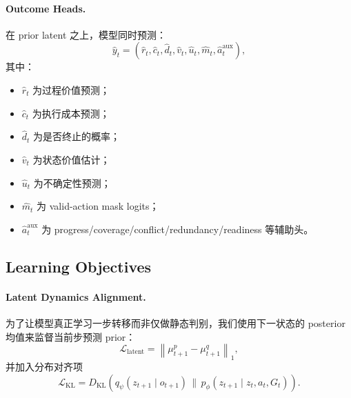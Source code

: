 \paragraph{Outcome Heads.}
在 prior latent 之上，模型同时预测：
\begin{equation}
    \hat{y}_t = \left(\hat{r}_t,\hat{c}_t,\hat{d}_t,\hat{v}_t,\hat{u}_t,\hat{m}_t,\hat{a}_t^{\text{aux}}\right),
\end{equation}
其中：
\begin{itemize}
    \item $\hat{r}_t$ 为过程价值预测；
    \item $\hat{c}_t$ 为执行成本预测；
    \item $\hat{d}_t$ 为是否终止的概率；
    \item $\hat{v}_t$ 为状态价值估计；
    \item $\hat{u}_t$ 为不确定性预测；
    \item $\hat{m}_t$ 为 valid-action mask logits；
    \item $\hat{a}_t^{\text{aux}}$ 为 progress/coverage/conflict/redundancy/readiness 等辅助头。
\end{itemize}

\subsection{Learning Objectives}

\paragraph{Latent Dynamics Alignment.}
为了让模型真正学习一步转移而非仅做静态判别，我们使用下一状态的 posterior 均值来监督当前步预测 prior：
\begin{equation}
    \mathcal{L}_{\text{latent}}
    =
    \left\|\mu_{t+1}^{p} - \mu_{t+1}^{q}\right\|_{1},
\end{equation}
并加入分布对齐项
\begin{equation}
    \mathcal{L}_{\text{KL}}
    =
    D_{\mathrm{KL}}\!\left(q_\psi(z_{t+1}\mid o_{t+1}) \,\|\, p_\phi(z_{t+1}\mid z_t,a_t,G_t)\right).
\end{equation}

